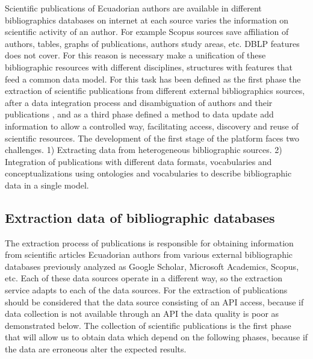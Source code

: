 \documentclass[11pt]{article}
\begin{document}
Scientific publications of Ecuadorian authors are available in different bibliographics databases on internet at each source varies the information on scientific activity of an author. For example Scopus sources  save affiliation of authors, tables, graphs of publications, authors study areas, etc. DBLP features does not cover. For this reason is necessary make a unification of these bibliographic resources with different disciplines, structures with features that feed a common data model. For this task has been defined as the first phase the extraction of scientific publications from different external bibliographics sources, after a data integration process and disambiguation of authors and their publications , and as a third phase defined a method to  data update add information to allow a controlled way, facilitating access, discovery and reuse of scientific resources.
The development of the first stage of the platform faces two challenges. 1) Extracting data from heterogeneous bibliographic sources. 2) Integration of publications with different data formats, vocabularies and conceptualizations using ontologies and vocabularies to describe bibliographic data in a single model.

\subsection{Extraction data of bibliographic databases}
The extraction process of publications is responsible for obtaining information from scientific articles Ecuadorian authors from various external bibliographic databases previously analyzed as Google Scholar, Microsoft Academics, Scopus, etc. Each of these data sources operate in a different way, so the extraction service adapts to each of the data sources. For the extraction of publications should be considered that the data source consisting of an API access, because if data collection is not available through an API the data quality is poor as demonstrated below. The collection of scientific publications is the first phase that will allow us to obtain data which depend on the following phases, because if the data are erroneous alter the expected results.
\end{document}
